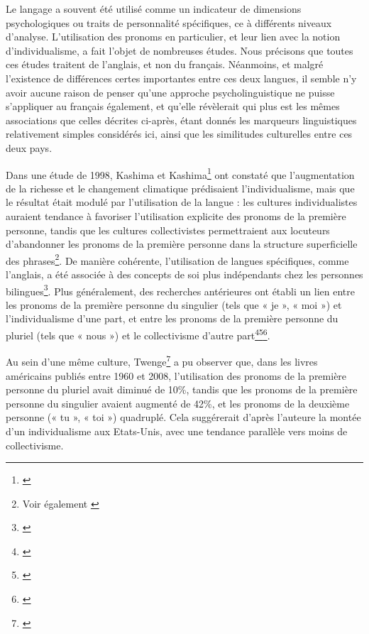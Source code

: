 Le langage a souvent été utilisé comme un indicateur de dimensions psychologiques ou traits de personnalité spécifiques, ce à différents niveaux d'analyse. L'utilisation des pronoms en particulier, et leur lien avec la notion d'individualisme, a fait l'objet de nombreuses études. Nous précisons que toutes ces études traitent de l’anglais, et non du français. Néanmoins, et malgré l’existence de différences certes importantes entre ces deux langues, il semble n’y avoir aucune raison de penser qu'une approche psycholinguistique ne puisse s’appliquer au français également, et qu’elle révèlerait qui plus est les mêmes associations que celles décrites ci-après, étant donnés les marqueurs linguistiques relativement simples considérés ici, ainsi que les similitudes culturelles entre ces deux pays. 

Dans une étude de 1998, Kashima et Kashima\footnote{\cite{kashima_culture_1998}} ont constaté que l'augmentation de la richesse et le changement climatique prédisaient l'individualisme, mais que le résultat était modulé par l'utilisation de la langue : les cultures individualistes auraient tendance à favoriser l'utilisation explicite des pronoms de la première personne, tandis que les cultures collectivistes permettraient aux locuteurs d'abandonner les pronoms de la première personne dans la structure superficielle des phrases\footnote{Voir également \cite{yu_cultural_2016}}. De manière cohérente, l'utilisation de langues spécifiques, comme l'anglais, a été associée à des concepts de soi plus indépendants chez les personnes bilingues\footnote{\cite{marian_self-construal_2004}}. Plus généralement, des recherches antérieures ont établi un lien entre les pronoms de la première personne du singulier (tels que « je », « moi ») et l'individualisme d'une part, et entre les pronoms de la première personne du pluriel (tels que « nous ») et le collectivisme d'autre part\footnote{\cite{gardner_i_1999}}\footnote{\cite{kashima_culture_1998}}\footnote{\cite{na_culture_2009}}.  

Au sein d’une même culture, Twenge\footnote{\cite{twenge_changes_2013}} a pu observer que, dans les livres américains publiés entre 1960 et 2008, l'utilisation des pronoms de la première personne du pluriel avait diminué de 10\%, tandis que les pronoms de la première personne du singulier avaient augmenté de 42\%, et les pronoms de la deuxième personne (« tu », « toi ») quadruplé. Cela suggérerait d'après l'auteure la montée d'un individualisme aux Etats-Unis, avec une tendance parallèle vers moins de collectivisme.

